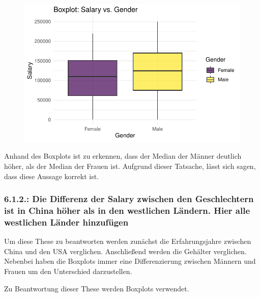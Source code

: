 \documentclass[
  letterpaper,
  DIV=11,
  numbers=noendperiod]{scrartcl}
\begin{document}
\begin{figure}[H]

{\centering \includegraphics{main_doc_files/figure-pdf/unnamed-chunk-66-1.pdf}

}

\end{figure}

Anhand des Boxplots ist zu erkennen, dass der Median der Männer deutlich
höher, als der Median der Frauen ist. Aufgrund dieser Tatsache, lässt
sich sagen, dass diese Aussage korrekt ist.

\hypertarget{die-differenz-der-salary-zwischen-den-geschlechtern-ist-in-china-huxf6her-als-in-den-westlichen-luxe4ndern.-hier-alle-westlichen-luxe4nder-hinzufuxfcgen}{%
\subsubsection{6.1.2.: Die Differenz der Salary zwischen den
Geschlechtern ist in China höher als in den westlichen Ländern. Hier
alle westlichen Länder
hinzufügen}\label{die-differenz-der-salary-zwischen-den-geschlechtern-ist-in-china-huxf6her-als-in-den-westlichen-luxe4ndern.-hier-alle-westlichen-luxe4nder-hinzufuxfcgen}}

Um diese These zu beantworten werden zunächst die Erfahrungsjahre
zwischen China und den USA verglichen. Anschließend werden die Gehälter
verglichen. Nebenbei haben die Boxplots immer eine Differenzierung
zwischen Männern und Frauen um den Unterschied darzustellen.

Zu Beantwortung dieser These werden Boxplots verwendet.
\end{document}
